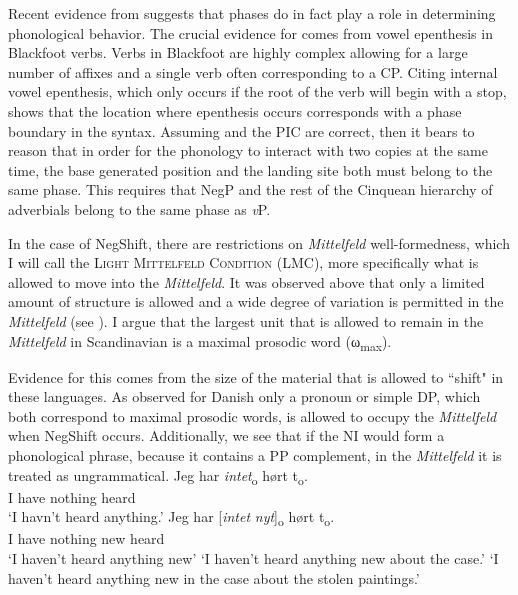 \documentclass[12pt, letterpaper]{article}
\newcommand{\sub}[1]{\textsubscript{#1}}
\begin{document}
Recent evidence from \citet{weberPhaseBasedConstraints2021} suggests that phases do in fact play a role in determining phonological behavior. The crucial evidence for \citeauthor{weberPhaseBasedConstraints2021} comes from vowel epenthesis in Blackfoot verbs. Verbs in Blackfoot are highly complex allowing for a large number of affixes and a single verb often corresponding to a CP. Citing internal vowel epenthesis, which only occurs if the root of the verb will begin with a stop, \citeauthor{weberPhaseBasedConstraints2021} shows that the location where epenthesis occurs corresponds with a phase boundary in the syntax. Assuming \citeauthor{weberPhaseBasedConstraints2021} and the PIC are correct, then it bears to reason that in order for the phonology to interact with two copies at the same time, the base generated position and the landing site both must belong to the same phase. This requires that NegP and the rest of the Cinquean hierarchy of adverbials \citep{cinqueAdverbsFunctionalHeads1999} belong to the same phase as \emph{v}P.

In the case of NegShift, there are restrictions on \emph{Mittelfeld} well-formedness, which I will call the \textsc{Light Mittelfeld Condition} (LMC), more specifically what is allowed to move into the \emph{Mittelfeld}. It was observed above that only a limited amount of structure is allowed and a wide degree of variation is permitted in the \emph{Mittelfeld} (see \cite{haiderMittelfeldPhenomenaScrambling2017}). I argue that the largest unit that is allowed to remain in the \emph{Mittelfeld} in Scandinavian is a maximal prosodic word (ω\sub{max}).

Evidence for this comes from the size of the material that is allowed to ``shift" in these languages. As observed for Danish only a pronoun or simple DP, which both correspond to maximal prosodic words, is allowed to occupy the \emph{Mittelfeld} when NegShift occurs. Additionally, we see that if the NI would form a phonological phrase, because it contains a PP complement, in the \emph{Mittelfeld} it is treated as ungrammatical. 
\ea 
	\ea 
		\gll Jeg har \textit{intet}\textsubscript{o} hørt t\textsubscript{o}.\\
		I have nothing heard\\
		\glt  `I havn't heard anything.'
	\ex 
		\gll Jeg har [\textit{intet} \textit{nyt}]\textsubscript{o} hørt t\textsubscript{o}.\\
		I have nothing new heard\\
		\glt `I haven't heard anything new'
		\glt `I haven't heard anything new about the case.'
		\glt `I haven't heard anything new in the case about the stolen paintings.'
	\z  	
\z 
\end{document}
